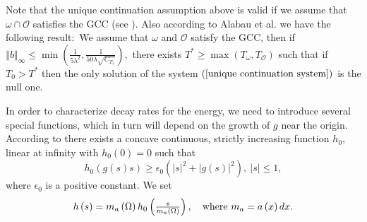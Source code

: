 \documentclass[11pt,reqno]{amsart}
\theoremstyle{plain}
\numberwithin{equation}{section}
\numberwithin{equation}{section}
\begin{document}
Note that the unique continuation assumption above is valid if we assume
that $\omega \cap \mathcal{O}$ satisfies the GCC (see \cite{Aloui-daou}).
Also according to Alabau et al. \cite[Proposition 4.7]{alab-lea control} we
have the following result$:$ We assume that $\omega $ and $\mathcal{O}$
satisfy the GCC, then if $\left\Vert b\right\Vert _{\infty }\leq \min \left( 
\frac{1}{5\lambda ^{2}},\frac{1}{50\lambda \sqrt{C_{T_{\omega }}}}\right) ,$
there exists $T^{\ast }\geq \max \left( T_{\omega },T_{\mathcal{O}}\right) $
such that if $T_{0}>T^{\ast }$ then the only solution of the system $\left( %
\ref{unique continuation system}\right) $ is the null one.\newline

In order to characterize decay rates for the energy, we need to introduce
several special functions, which in turn will depend on the growth of $g$
near the origin. According to \cite{las-tat} there exists a concave
continuous, strictly increasing function $h_{0}$, linear at infinity with $%
h_{0}(0)=0$ such that%
\begin{equation}
h_{0}\left( g\left( s\right) s\right) \geq \epsilon _{0}\left( \left\vert
s\right\vert ^{2}+\left\vert g\left( s\right) \right\vert ^{2}\right)
,~\left\vert s\right\vert \leq 1,  \label{h0 defin}
\end{equation}%
where $\epsilon _{0}$ is a positive constant$.$ We set%
\begin{equation}
\begin{array}{c}
h\left( s\right) =m_{a}\left( \Omega \right) h_{0}\left( \frac{s}{%
m_{a}\left( \Omega \right) }\right) ,\text{ where }m_{a}=a\left( x\right) dx.%
\end{array}
\label{h defin}
\end{equation}
\end{document}
